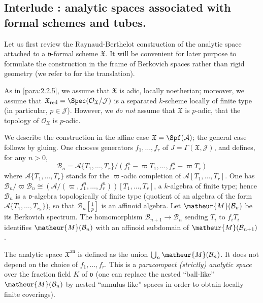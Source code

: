 \subsection{Interlude : analytic spaces associated with formal schemes
 and tubes.}\label{sub:3.5}

\begin{para}\label{para:3.5.1} Let us first review the Raynaud-Berthelot
construction of the analytic space attached to a  
$\mathfrak{v}$-formal scheme $\mathfrak{X}$. It will be convenient for
later purpose to formulate the construction in the frame of Berkovich
spaces rather than rigid geometry (we refer to \cite[1.6]{ecfnas} for the
translation).


As in \ref{para:2.2.5}, we assume that $\mathfrak{X}$ is adic, locally
noetherian; moreover, we assume that 
${\mathfrak{X}}_{\mathrm{red}}=\Spec(\mathcal{O}_{\mathfrak{X}}/\mathcal{J})$ is a
separated $k$-scheme locally of finite type (in particular,
$p\in \mathcal{J}$). However, we {\it do not} assume that $\mathfrak{X}$ is
$p$-adic, \ie that the topology of $\mathcal{O}_{\mathfrak{X}}$
is $p$-adic.

 We describe the construction in the affine case ${\mathfrak{X}} =
 \Spf(\mathcal{A})$; the general case follows by gluing. One chooses
 generators $f_1,\ldots, f_r$ of 
 $J=\Gamma({\mathfrak{X}},\mathcal{J})$, and defines, for any $n>0$,
 \begin{equation*}
 \mathcal{B}_n=\mathcal{A}\{T_1,\ldots,T_r\}/(f_1^n-\varpi T_1,\ldots,
 f_r^n-\varpi T_r)
 \end{equation*}
 where $\mathcal{A}\{T_1,\ldots,T_r\}$ stands for the $\varpi$-adic
 completion of $\mathcal{A}[T_1,\ldots,T_r]$. One has
 $\mathcal{B}_n/\varpi\mathcal{B}_n\cong
 (\mathcal{A}/(\varpi,f_1^n,\ldots,f_r^n))[T_1,\ldots,T_r]$, a
 $k$-algebra of finite type; hence $\mathcal{B}_n$ is a
 $\mathfrak{v}$-algebra topologically of finite type (\ie quotient of an
 algebra of the form $\mathcal{A}\{T_1,\ldots,T_{r_n}\}$), so that
 $\mathcal{B}_n[\frac{1}{p}]$ is an affinoid algebra. Let
 $\matheur{M}(\mathcal{B}_n)$ be its Berkovich spectrum. The
 homomorphism $\mathcal{B}_{n+1}\rightarrow \mathcal{B}_n$ sending $T_i$
 to $f_iT_i$ identifies $\matheur{M}(\mathcal{B}_n)$ with an affinoid
 subdomain of $\matheur{M}(\mathcal{B}_{n+1})$ \cite[0.2.6]{crecrasp}.


 The analytic space $\mathfrak{X}^{\mathrm{an}}$ is defined as the union
 $\bigcup_n \matheur{M}(\mathcal{B}_n)$. It does 
 not depend on the choice of $f_1,\ldots, f_r$. This is a {\it
 paracompact (strictly) analytic space} over the fraction 
 field $K$ of $\mathfrak{v}$  (one can replace the nested ``ball-like''
 $\matheur{M}(\mathcal{B}_n)$ by nested ``annulus-like'' 
 spaces in order to obtain locally finite coverings). 
\end{para}

